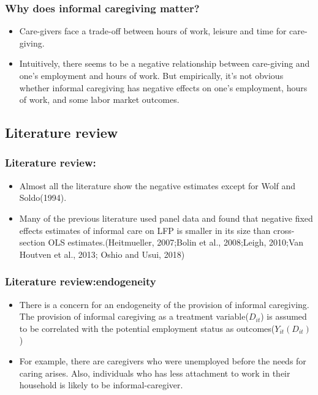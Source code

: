 \documentclass{beamer}
\begin{document}
        \begin{frame}\frametitle{Why does informal caregiving matter?}
            \begin{itemize}
                \item Care-givers face a trade-off between hours of work, leisure and time for care-giving.
                \item Intuitively, there seems to be a negative relationship between care-giving and one's employment and hours of work. But empirically, it's not obvious whether informal caregiving has negative effects on one's employment, hours of work, and some labor market outcomes.  
            \end{itemize}
        \end{frame}

    \subsection{Literature review}
        \begin{frame}\frametitle{Literature review:}
            \begin{itemize}
                \item Almost all the literature show the negative estimates except for Wolf and Soldo(1994).
                \item Many of the previous literature used panel data and found that negative fixed effects estimates of informal care on LFP is smaller in its size than cross-section OLS estimates.(Heitmueller, 2007;Bolin et al., 2008;Leigh, 2010;Van Houtven et al., 2013; Oshio and Usui, 2018)
            \end{itemize}
        \end{frame}
        \begin{frame}\frametitle{Literature review:endogeneity}
            \begin{itemize}
                \item There is a concern for an endogeneity of the provision of informal caregiving. The provision of informal caregiving as a treatment variable($D_{it}$) is assumed to be correlated with the potential employment status as outcomes($Y_{it}(D_{it})$)
                \item For example, there are caregivers who were unemployed before the needs for caring arises. Also, individuals who has less attachment to work in their household is likely to be informal-caregiver.
            \end{itemize}
        \end{frame}
\end{document}
